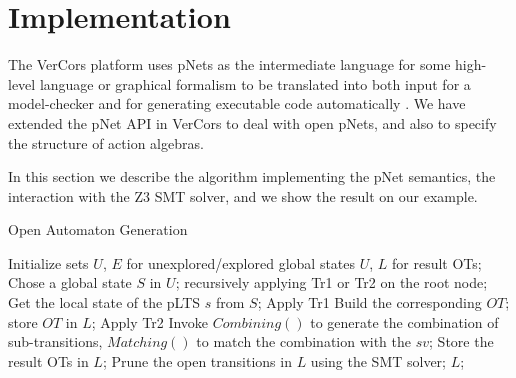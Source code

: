 \documentclass{lncs/llncs}
\begin{document}



\section{Implementation}
\label{section:implementation}
The VerCors platform uses pNets as the intermediate language
for some high-level language or graphical formalism to be translated
into both input for a model-checker and for generating executable code
automatically \cite{HKM-FASE16}.
We have extended the pNet API in VerCors to deal with open pNets, and
also to specify the structure of action algebras. 

In this section we describe the algorithm implementing the pNet
semantics, the interaction with the Z3 SMT solver, and we show the
result on our  example.

\begin{algorithm}
\caption{Open Automaton Generation}
\begin{algorithmic}[1]

\State Initialize sets $U$, $E$ for unexplored/explored global states
$U$, $L$ for result OTs;
	\State Chose a global state $S$ in $U$; recursively applying Tr1 or Tr2 on the root node;
                \State Get the local state of the pLTS $s$ from $S$;
		 Apply Tr1
			\State Build the corresponding
                        $OT$; store $OT$ in $L$; 
                 \EndFor
	\EndIf
		 Apply Tr2
			\State Invoke $Combining()$ to generate the
                        combination of sub-transitions, $Matching()$
                        to match the combination with the $sv$; Store the result OTs in $L$; 
		\EndFor
	\EndIf
	\EndFor
\EndWhile
\State Prune the open transitions in $L$ using the SMT solver;
\State \Return $L$;

\end{algorithmic}  
\end{algorithm}
\end{document}
